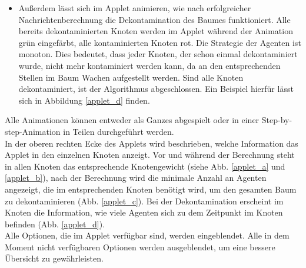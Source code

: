 \begin{itemize}
	\item Außerdem lässt sich im Applet animieren, wie nach erfolgreicher Nachrichtenberechnung die Dekontamination des Baumes funktioniert. Alle bereits dekontaminierten Knoten werden im Applet während der Animation grün eingefärbt, alle kontaminierten Knoten rot. Die Strategie der Agenten ist  monoton. Dies bedeutet, dass jeder Knoten, der schon einmal dekontaminiert wurde, nicht mehr kontaminiert werden kann, da an den entsprechenden Stellen im Baum Wachen aufgestellt werden. Sind alle Knoten dekontaminiert, ist der Algorithmus abgeschlossen. Ein Beispiel hierfür lässt sich in Abbildung \ref{applet_d} finden.
\end{itemize}

Alle Animationen können entweder als Ganzes abgespielt oder in einer Step-by-step-Animation in Teilen durchgeführt werden. \\
In der oberen rechten Ecke des Applets wird beschrieben, welche Information das Applet in den einzelnen Knoten anzeigt. Vor und während der Berechnung steht in allen Knoten das entsprechende Knotengewicht (siehe Abb. \ref{applet_a} und \ref{applet_b}), nach der Berechnung wird die minimale Anzahl an Agenten angezeigt, die im entsprechenden Knoten benötigt wird, um den gesamten Baum zu dekontaminieren (Abb. \ref{applet_c}). Bei der Dekontamination erscheint im Knoten die Information, wie viele Agenten sich zu dem Zeitpunkt im Knoten befinden (Abb. \ref{applet_d}).\\
Alle Optionen, die im Applet verfügbar sind, werden eingeblendet. Alle in dem Moment nicht verfügbaren Optionen werden ausgeblendet, um eine bessere Übersicht zu gewährleisten.


